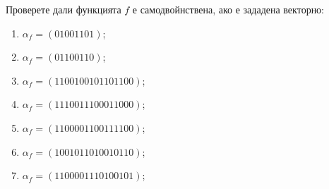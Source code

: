 \begin{problem}
  Проверете дали функцията $f$ е самодвойнствена, ако е зададена векторно:
  \begin{enumerate}[1)]
  \item
    $\alpha_f = (01001101)$;
  \item
    $\alpha_f = (01100110)$;
  \item
    $\alpha_f = (1100 1001 0110 1100)$;
  \item
    $\alpha_f = (1110 0111 0001 1000)$;
  \item
    $\alpha_f = (1100 0011 0011 1100)$;
  \item
    $\alpha_f = (1001 0110 1001 0110)$;
  \item
    $\alpha_f = (1100 0011 1010 0101)$;
  \end{enumerate}
\end{problem}

